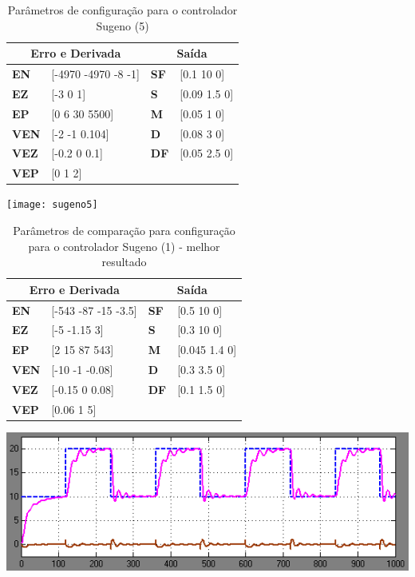 \documentclass[
	twoside,				%
	twocolumn,				%
	english,				%
	brazil,					%
]{article}
\begin{document}
\begin{table}
\caption{Parâmetros de configuração para o controlador Sugeno (5)}
\centering
\begin{tabular}{llll}
\toprule
\multicolumn{2}{c}{\textbf{Erro e Derivada}} & \multicolumn{2}{c}{\textbf{Saída}}  \\
\midrule
\textbf{EN} & [-4970  -4970  -8  -1] & \textbf{SF} & [0.1 10 0] \\
\textbf{EZ} & [-3 0 1] & \textbf{S} & [0.09 1.5 0] \\
\textbf{EP} & [0 6 30 5500] & \textbf{M} & [0.05 1 0] \\
\textbf{VEN} & [-2  -1 0.104] & \textbf{D} & [0.08 3 0] \\
\textbf{VEZ} & [-0.2 0 0.1] & \textbf{DF} & [0.05 2.5 0] \\
\textbf{VEP} & [0 1 2] & & \\
\bottomrule
\end{tabular}
\end{table}

\texttt{[image: sugeno5]}

\begin{table}[htbp]
\caption{Parâmetros de comparação para configuração para o controlador Sugeno (1) - melhor resultado}
\centering
\begin{tabular}{llll}
\toprule
\multicolumn{2}{c}{\textbf{Erro e Derivada}} & \multicolumn{2}{c}{\textbf{Saída}}  \\
\midrule
\textbf{EN} & [-543  -87  -15  -3.5] & \textbf{SF} & [0.5 10 0] \\
\textbf{EZ} & [-5 -1.15 3] & \textbf{S} & [0.3 10 0] \\
\textbf{EP} & [2 15 87 543] & \textbf{M} & [0.045 1.4 0] \\
\textbf{VEN} & [-10  -1  -0.08] & \textbf{D} & [0.3 3.5 0] \\
\textbf{VEZ} & [-0.15 0 0.08] & \textbf{DF} & [0.1 1.5 0] \\
\textbf{VEP} & [0.06 1 5] & & \\
\bottomrule
\end{tabular}
\end{table}

\includegraphics[width=\columnwidth]{sugeno1}
\end{document}

